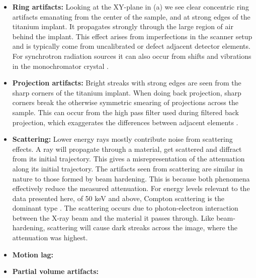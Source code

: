 \begin{itemize}
  \item \textbf{Ring artifacts:} Looking at the XY-plane in
  	(a) we see clear concentric ring artifacts emanating
	from the center of the sample, and at strong edges of the
	titanium implant. It propagates strongly through the large
	region of air behind the implant. This effect arises from
	imperfections in the scanner setup and is typically come from
	uncalibrated or defect adjacent detector elements. For
	synchrotron radiation sources it can also occur from shifts and
	vibrations in the monochromator crystal \citep{ringartefacts}.

  \item \textbf{Projection artifacts:} Bright streaks with strong edges are
	seen from the sharp corners of the titanium implant. When doing back
	projection, sharp corners break the otherwise symmetric
	smearing of projections across the sample.  This can occur from
	the high pass filter used during filtered back projection,
	which exaggerates the differences between adjacent elements
	\citep{ctnoise}.

  \item \textbf{Scattering:} Lower energy rays mostly contribute noise
      from scattering effects. A ray will propagate through a material, get
      scattered and diffract from its initial trajectory. This gives a
      misrepresentation of the attenuation along its initial trajectory. The
      artifacts seen from scattering are similar in nature to those formed by
      beam hardening. This is because both phenomena effectively reduce the
      measured attenuation. For energy levels relevant to the data presented
      here, of 50 keV and above, Compton scattering is the dominant type
      \citep{Compton}. The scattering occurs due to photon-electron interaction
      between the X-ray beam and the material it passes through. Like
      beam-hardening, scattering will cause dark streaks across the image,
      where the attenuation was highest.

      \citep{attenuation-cross-sections}


   \item \textbf{Motion lag:}
   \item \textbf{Partial volume artifacts:}
\end{itemize}


